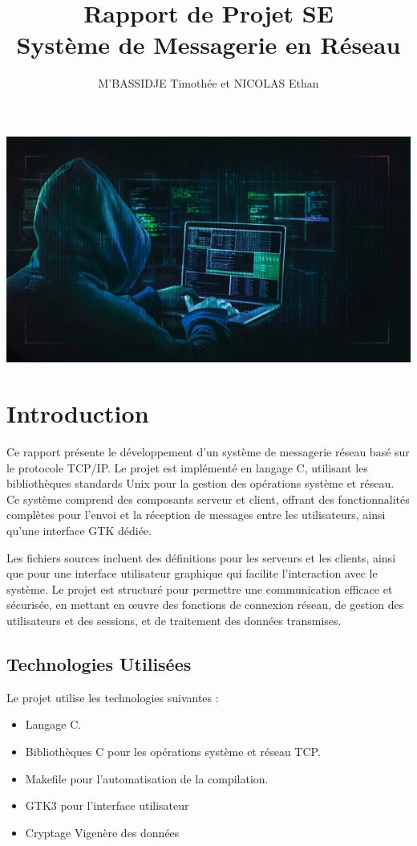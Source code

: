 \documentclass{article}
\title{Rapport de Projet SE  \\ \vspace{1cm} Système de Messagerie en Réseau}
\author{M'BASSIDJE Timothée et NICOLAS Ethan }
\begin{document}
\maketitle
\vspace{2cm}

\includegraphics[width=1\textwidth]{cover.jpg}

\newpage
\tableofcontents
\newpage

\section{Introduction}

Ce rapport présente le développement d'un système de messagerie réseau basé sur le protocole TCP/IP. Le projet est implémenté en langage C, utilisant les bibliothèques standards Unix pour la gestion des opérations système et réseau. Ce système comprend des composants serveur et client, offrant des fonctionnalités complètes pour l'envoi et la réception de messages entre les utilisateurs, ainsi qu'une interface GTK dédiée.

\vspace{0.3cm} Les fichiers sources incluent des définitions pour les serveurs et les clients, ainsi que pour une interface utilisateur graphique qui facilite l'interaction avec le système. Le projet est structuré pour permettre une communication efficace et sécurisée, en mettant en œuvre des fonctions de connexion réseau, de gestion des utilisateurs et des sessions, et de traitement des données transmises.

\subsection{Technologies Utilisées}
Le projet utilise les technologies suivantes :
\begin{itemize}
    \item Langage C.
    \item Bibliothèques C pour les opérations système et réseau TCP.
    \item Makefile pour l'automatisation de la compilation.
    \item GTK3 pour l'interface utilisateur
    \item Cryptage Vigenère des données
\end{itemize}
\end{document}
